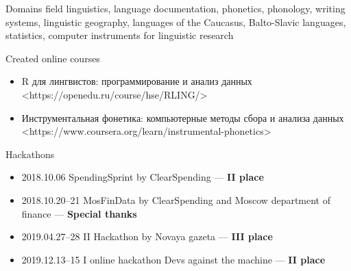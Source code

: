 \documentclass{resume} %
\begin{document}
\begin{rSection}{Domains}
field linguistics, language documentation,  phonetics, phonology, writing systems, linguistic geography, languages of the Caucasus, Balto-Slavic languages, statistics, computer instruments for linguistic research
\end{rSection}

\begin{rSection}{Created online courses}
\begin{itemize}
\item R для лингвистов: программирование и анализ данных\\
<https://openedu.ru/course/hse/RLING/>
\item Инструментальная фонетика: компьютерные методы сбора и анализа данных\\
<https://www.coursera.org/learn/instrumental-phonetics>
\end{itemize}

\end{rSection}

\begin{rSection}{Hackathons}
\begin{itemize}
\item 2018.10.06  SpendingSprint by ClearSpending  --- \textbf{II place}
\item 2018.10.20--21  MosFinData by ClearSpending and Moscow department of finance
 --- \textbf{Special thanks} 
\item  2019.04.27--28 II Hackathon by Novaya gazeta --- \textbf{III place} 
\item 2019.12.13--15 I online hackathon Devs against the machine --- \textbf{II place} 
\end{itemize}

\end{rSection}
\end{document}
